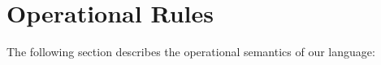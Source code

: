 
\section{Operational Rules}
The following section describes the operational semantics of our language:








